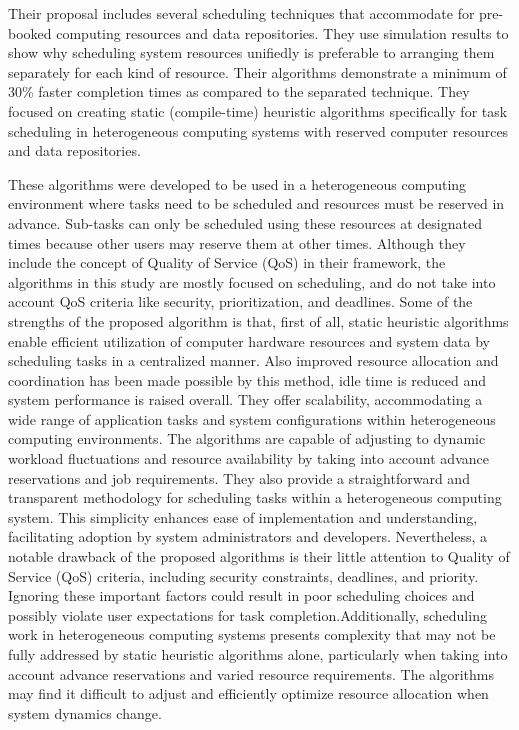 \documentclass[16pt,a4paper]{article}
\begin{document}
Their proposal includes several scheduling techniques that accommodate for pre-booked computing resources and data repositories. They use simulation results to show why scheduling system resources unifiedly is preferable to arranging them separately for each kind of resource. Their algorithms demonstrate a minimum of 30\% faster completion times as compared to the separated technique. They focused on creating static (compile-time) heuristic algorithms specifically for task scheduling in heterogeneous computing systems with reserved computer resources and data repositories. 

These algorithms were developed to be used in a heterogeneous computing environment where tasks need to be scheduled and resources must be reserved in advance. Sub-tasks can only be scheduled using these resources at designated times because other users may reserve them at other times. Although they include the concept of Quality of Service (QoS) in their framework, the algorithms in this study are mostly focused on scheduling, and do not take into account QoS criteria like security, prioritization, and deadlines. Some of the strengths of the proposed algorithm is that, first of all, static heuristic algorithms enable efficient utilization of computer hardware resources and system data by scheduling tasks in a centralized manner. Also improved resource allocation and coordination has been made possible by this method, idle time is reduced and system performance is raised overall. They offer scalability, accommodating a wide range of application tasks and system configurations within heterogeneous computing environments. The algorithms are capable of adjusting to dynamic workload fluctuations and resource availability by taking into account advance reservations and job requirements. They also provide a straightforward and transparent methodology for scheduling tasks within a heterogeneous computing system. This simplicity enhances ease of implementation and understanding, facilitating adoption by system administrators and developers. Nevertheless, a notable drawback of the proposed algorithms is their little attention to Quality of Service (QoS) criteria, including security constraints, deadlines, and priority. Ignoring these important factors could result in poor scheduling choices and possibly violate user expectations for task completion.Additionally, scheduling work in heterogeneous computing systems presents complexity that may not be fully addressed by static heuristic algorithms alone, particularly when taking into account advance reservations and varied resource requirements. The algorithms may find it difficult to adjust and efficiently optimize resource allocation when system dynamics change. 
\end{document}
